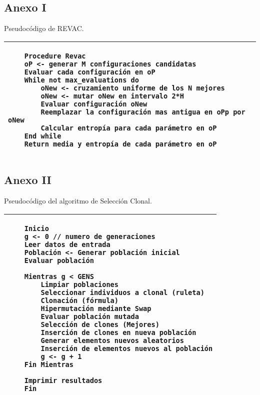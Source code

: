 \subsection{Anexo I}
Pseudocódigo de REVAC.
\label{sec:anexo1}

\begin{tabular}{|p{12cm}|}
\hline

\begin{verbatim}
    Procedure Revac
    oP <- generar M configuraciones candidatas
    Evaluar cada configuración en oP
    While not max_evaluations do
        oNew <- cruzamiento uniforme de los N mejores
        oNew <- mutar oNew en intervalo 2*H
        Evaluar configuración oNew
        Reemplazar la configuración mas antigua en oPp por oNew
        Calcular entropía para cada parámetro en oP
    End while
    Return media y entropía de cada parámetro en oP
\end{verbatim}\\

\hline
\end{tabular}

\subsection{Anexo II}
Pseudocódigo del algoritmo de Selección Clonal.
\label{sec:anexo2}

\begin{tabular}{|p{12cm}|}
\hline
\begin{verbatim}
    Inicio
    g <- 0 // numero de generaciones
    Leer datos de entrada
    Población <- Generar población inicial
    Evaluar población

    Mientras g < GENS
        Limpiar poblaciones
        Seleccionar individuos a clonal (ruleta)
        Clonación (fórmula)
        Hipermutación mediante Swap
        Evaluar población mutada
        Selección de clones (Mejores)
        Inserción de clones en nueva población
        Generar elementos nuevos aleatorios
        Inserción de elementos nuevos al población
        g <- g + 1
    Fin Mientras

    Imprimir resultados
    Fin
\end{verbatim}\\

\hline
\end{tabular}
